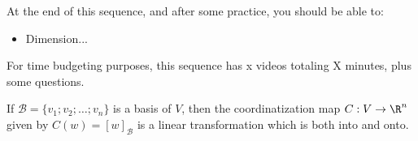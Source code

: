 







At the end of this sequence, and after some practice, you should be able to:

\begin{itemize} 
\item Dimension... 
\end{itemize}


For time budgeting purposes, this sequence has x videos totaling X minutes, 
plus some questions.  




\endedxtext

\endedxvertical














{}  If $\mathcal{B}  = \{v_1; v_2; \ldots ; v_n\}$ is a basis of $V$, then the
coordinatization map $C: V \rightarrow \R^n$ given by $C(w) = [w]_{\mathcal{B}}$ is a linear transformation
which is both into and onto.

